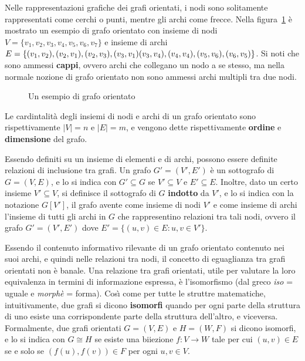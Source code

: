 Nelle rappresentazioni grafiche dei grafi orientati, i nodi sono solitamente rappresentati
come cerchi o punti, mentre gli archi come frecce.
Nella figura~\ref{fig:directed-graph-example} \`e mostrato un esempio di grafo orientato con insieme di nodi
$V = \{v_1, v_2, v_3, v_4, v_5, v_6, v_7\}$ e insieme di archi $E = \{(v_1, v_2), (v_2, v_1), (v_2, v_3), (v_3, v_1)
(v_3, v_4), \\ (v_4, v_4), (v_5, v_6), (v_6, v_5)\}$. \newline
Si noti che sono ammessi \textbf{cappi}, ovvero archi che collegano un nodo a se stesso, ma nella normale nozione
di grafo orientato non sono ammessi archi multipli tra due nodi.

\begin{figure}[h]
    \centering
    
    \caption{Un esempio di grafo orientato}
    \label{fig:directed-graph-example}
\end{figure}

Le cardintalit\`a degli insiemi di nodi e archi di un grafo orientato sono rispettivamente $|V| = n$ e $|E| = m$,
e vengono dette rispettivamente \textbf{ordine} e \textbf{dimensione} del grafo.

Essendo definiti su un insieme di elementi e di archi, possono essere definite relazioni di inclusione tra grafi.
Un grafo $G' = (V', E')$ \`e un sottografo di $G = (V, E)$, e lo si indica con $G' \subseteq G$ se $V' \subseteq V$
e $E' \subseteq E$. \newline
Inoltre, dato un certo insieme $V' \subseteq V$, si definisce il sottografo di $G$ \textbf{indotto} da $V'$, e lo si
indica con la notazione $G[V']$, il grafo avente come insieme di nodi $V'$ e come insieme di archi l'insieme di tutti
gli archi in $G$ che rappresentino relazioni tra tali nodi, ovvero il grafo $G' = (V', E')$ dove
$E' = \{ (u, v) \in E : u, v \in V'\}$. \newline

Essendo il contenuto informativo rilevante di un grafo orientato contenuto nei suoi archi, e quindi nelle relazioni
tra nodi, il concetto di eguaglianza tra grafi orientati non \`e banale.
Una relazione tra grafi orientati, utile per valutare la loro equivalenza in termini di informazione espressa,
\`e l'isomorfismo (dal greco \textit{iso} = uguale e \textit{morph\`e} = forma).
Cos\`{\i} come per tutte le struttre matematiche, intuitivamente, due grafi si dicono \textbf{isomorfi} quando per ogni
parte della struttura di uno esiste una corrispondente parte della struttura dell'altro, e viceversa.
Formalmente, due grafi orientati $G = (V, E)$ e $H = (W, F)$ si dicono isomorfi, e lo si indica con $G \cong H$ se
esiste una biiezione $f: V \rightarrow W$ tale per cui $(u, v) \in E$ se e solo se $(f(u), f(v)) \in F$ per ogni
$u, v \in V$. \newline

